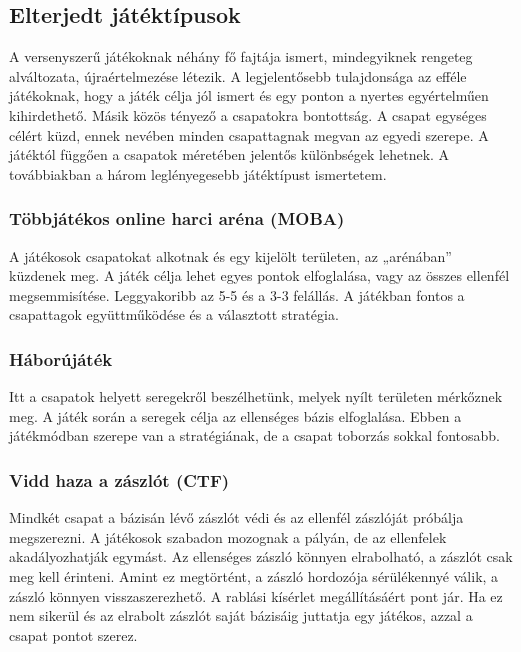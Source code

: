 \documentclass[bibliography=totocnumbered]{article}
\begin{document}
\subsection{Elterjedt
játéktípusok}

A versenyszerű játékoknak néhány fő fajtája ismert, mindegyiknek
rengeteg alváltozata, újraértelmezése létezik. A legjelentősebb
tulajdonsága az efféle játékoknak, hogy a játék célja jól ismert és egy
ponton a nyertes egyértelműen kihirdethető. Másik közös tényező a
csapatokra bontottság. A csapat egységes célért küzd, ennek nevében
minden csapattagnak megvan az egyedi szerepe. A játéktól függően a
csapatok méretében jelentős különbségek lehetnek. A továbbiakban a három
leglényegesebb játéktípust ismertetem.


\subsubsection{Többjátékos online harci aréna
(MOBA)}

A játékosok csapatokat alkotnak és egy kijelölt területen, az
„arénában'' küzdenek meg. A játék célja lehet egyes pontok elfoglalása,
vagy az összes ellenfél megsemmisítése. Leggyakoribb az 5-5 és a 3-3
felállás. A játékban fontos a csapattagok együttműködése és a választott
stratégia.


\subsubsection{Háborújáték}

Itt a csapatok helyett seregekről beszélhetünk, melyek nyílt területen
mérkőznek meg. A játék során a seregek célja az ellenséges bázis
elfoglalása. Ebben a játékmódban szerepe van a stratégiának, de a csapat
toborzás sokkal fontosabb.


\subsubsection{Vidd haza a zászlót
(CTF)}

Mindkét csapat a bázisán lévő zászlót védi és az ellenfél zászlóját
próbálja megszerezni. A játékosok szabadon mozognak a pályán, de az
ellenfelek akadályozhatják egymást. Az ellenséges zászló könnyen
elrabolható, a zászlót csak meg kell érinteni. Amint ez megtörtént, a
zászló hordozója sérülékennyé válik, a zászló könnyen visszaszerezhető.
A rablási kísérlet megállításáért pont jár. Ha ez nem sikerül és az
elrabolt zászlót saját bázisáig juttatja egy játékos, azzal a csapat
pontot szerez.
\end{document}
